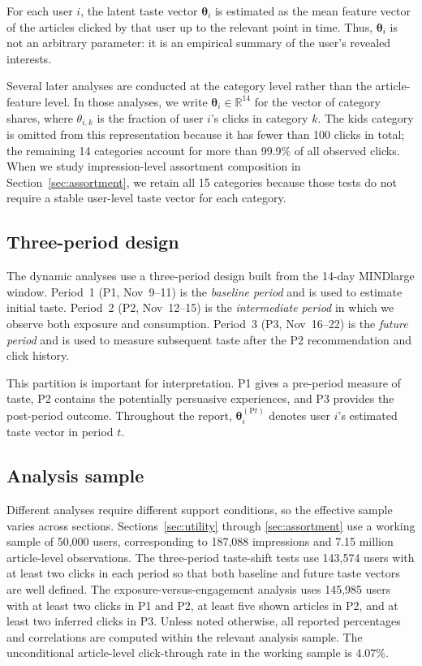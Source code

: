 \documentclass[11pt]{article}
\begin{document}
For each user $i$, the latent taste vector $\boldsymbol{\theta}_i$ is estimated as the mean feature vector of the articles clicked by that user up to the relevant point in time. Thus, $\boldsymbol{\theta}_i$ is not an arbitrary parameter: it is an empirical summary of the user's revealed interests.

Several later analyses are conducted at the category level rather than the article-feature level. In those analyses, we write $\boldsymbol{\theta}_i \in \mathbb{R}^{14}$ for the vector of category shares, where $\theta_{i,k}$ is the fraction of user $i$'s clicks in category $k$. The kids category is omitted from this representation because it has fewer than 100 clicks in total; the remaining 14 categories account for more than 99.9\% of all observed clicks. When we study impression-level assortment composition in Section~\ref{sec:assortment}, we retain all 15 categories because those tests do not require a stable user-level taste vector for each category.

\subsection{Three-period design}
\label{sec:three_period_design}

The dynamic analyses use a three-period design built from the 14-day MINDlarge window. Period~1 (P1, Nov~9--11) is the \emph{baseline period} and is used to estimate initial taste. Period~2 (P2, Nov~12--15) is the \emph{intermediate period} in which we observe both exposure and consumption. Period~3 (P3, Nov~16--22) is the \emph{future period} and is used to measure subsequent taste after the P2 recommendation and click history.

This partition is important for interpretation. P1 gives a pre-period measure of taste, P2 contains the potentially persuasive experiences, and P3 provides the post-period outcome. Throughout the report, $\boldsymbol{\theta}_i^{(\mathrm{P}t)}$ denotes user $i$'s estimated taste vector in period $t$.

\subsection{Analysis sample}

Different analyses require different support conditions, so the effective sample varies across sections. Sections~\ref{sec:utility} through \ref{sec:assortment} use a working sample of 50,000 users, corresponding to 187,088 impressions and 7.15 million article-level observations. The three-period taste-shift tests use 143,574 users with at least two clicks in each period so that both baseline and future taste vectors are well defined. The exposure-versus-engagement analysis uses 145,985 users with at least two clicks in P1 and P2, at least five shown articles in P2, and at least two inferred clicks in P3. Unless noted otherwise, all reported percentages and correlations are computed within the relevant analysis sample. The unconditional article-level click-through rate in the working sample is 4.07\%.
\end{document}
